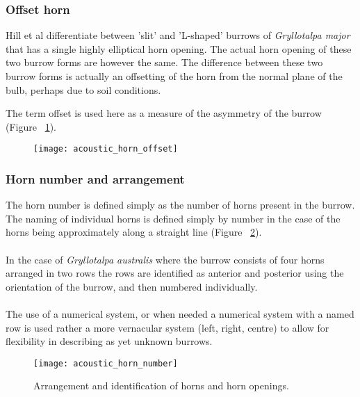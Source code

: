\documentclass{article}
\begin{document}
   \subsubsection{Offset horn}
   Hill et al \cite{hill2006} differentiate between 'slit' and 'L-shaped' burrows of \textit{Gryllotalpa major} that has a single highly elliptical horn opening. The actual horn opening of these two burrow forms are however the same. The difference between these two burrow forms is actually an offsetting of the horn from the normal plane of the bulb, perhaps due to soil conditions.
   
   The term offset is used here as a measure of the asymmetry of the burrow (Figure ~\ref{fig:acoustic_horn_offset}).
   
   \begin{figure}[h]
   	\texttt{[image: acoustic\_horn\_offset]}
   	\caption{}
   	\label{fig:acoustic_horn_offset}
   \end{figure}
   
   \subsubsection{Horn number and arrangement}
   The horn number is defined simply as the number of horns present in the burrow. The naming of individual horns is defined simply by number in the case of the horns being approximately along a straight line (Figure ~\ref{fig:acoustic_horn_number}).
   \paragraph{}
   In the case of \textit{Gryllotalpa australis} where the burrow consists of four horns arranged in two rows the rows are identified as anterior and posterior using the orientation of the burrow, and then numbered individually.
   \paragraph{}
   The use of a numerical system, or when needed a numerical system with a named row is used rather a more vernacular system (left, right, centre) to allow for flexibility in describing as yet unknown burrows.
   
   \begin{figure}[h]
   	\texttt{[image: acoustic\_horn\_number]}
   	\caption{Arrangement and identification of horns and horn openings.}
   	\label{fig:acoustic_horn_number}
   \end{figure}
   
\end{document}
